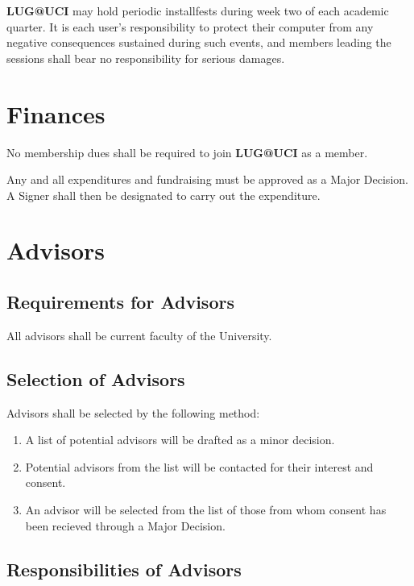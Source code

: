 \documentclass{article}
\begin{document}
\textbf{LUG@UCI} may hold periodic installfests during week two of each
academic quarter. It is each user's responsibility to protect their computer
from any negative consequences sustained during such events, and members
leading the sessions shall bear no responsibility for serious damages.

\section{Finances}

No membership dues shall be required to join \textbf{LUG@UCI} as a member.

Any and all expenditures and fundraising must be approved as a Major Decision.
A Signer shall then be designated to carry out the expenditure.


\section{Advisors}


\subsection{Requirements for Advisors}

All advisors shall be current faculty of the University.

\subsection{Selection of Advisors}

Advisors shall be selected by the following method:

\begin{enumerate}
\item A list of potential advisors will be drafted as a minor decision.
\item Potential advisors from the list will be contacted for their
    interest and consent.
\item An advisor will be selected from the list of those from whom
    consent has been recieved through a Major Decision.
\end{enumerate}

\subsection{Responsibilities of Advisors}
\end{document}
